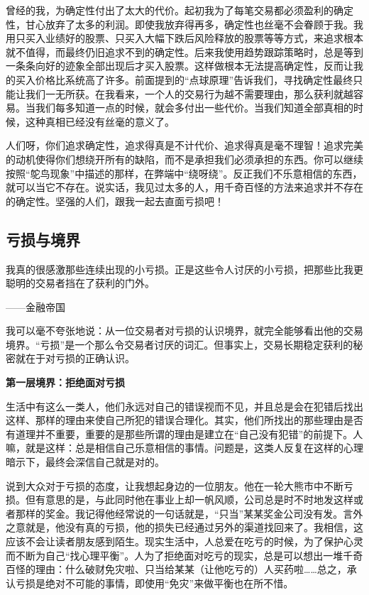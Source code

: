 曾经的我，为确定性付出了太大的代价。起初我为了每笔交易都必须盈利的确定性，甘心放弃了太多的利润。即使我放弃得再多，确定性也丝毫不会眷顾于我。我用只买入业绩好的股票、只买入大幅下跌后风险释放的股票等等方式，来追求根本就不值得，而最终仍旧追求不到的确定性。后来我使用趋势跟踪策略时，总是等到一条条向好的迹象全部出现后才买入股票。这样做根本无法提高确定性，反而让我的买入价格比系统高了许多。前面提到的“点球原理”告诉我们，寻找确定性最终只能让我们一无所获。在我看来，一个人的交易行为越不需要理由，那么获利就越容易。当我们每多知道一点的时候，就会多付出一些代价。当我们知道全部真相的时候，这种真相已经没有丝毫的意义了。

人们呀，你们追求确定性，追求得真是不计代价、追求得真是毫不理智！追求完美的动机使得你们想绕开所有的缺陷，而不是承担我们必须承担的东西。你可以继续按照“鸵鸟现象”中描述的那样，在弊端中“绕呀绕”。反正我们不乐意相信的东西，就可以当它不存在。说实话，我见过太多的人，用千奇百怪的方法来追求并不存在的确定性。坚强的人们，跟我一起去直面亏损吧！

\subsection{亏损与境界}

{\kaishu
我真的很感激那些连续出现的小亏损。正是这些令人讨厌的小亏损，把那些比我更聪明的交易者挡在了获利的门外。

\hfill ——金融帝国
}

我可以毫不夸张地说：从一位交易者对亏损的认识境界，就完全能够看出他的交易境界。“亏损”是一个那么令交易者讨厌的词汇。但事实上，交易长期稳定获利的秘密就在于对亏损的正确认识。

\textbf{第一层境界：拒绝面对亏损}

生活中有这么一类人，他们永远对自己的错误视而不见，并且总是会在犯错后找出这样、那样的理由来使自己所犯的错误合理化。其实，他们所找出的那些理由是否有道理并不重要，重要的是那些所谓的理由是建立在“自己没有犯错”的前提下。人嘛，就是这样：总是相信自己乐意相信的事情。问题是，这类人反复在这样的心理暗示下，最终会深信自己就是对的。

说到大众对于亏损的态度，让我想起身边的一位朋友。他在一轮大熊市中不断亏损。但有意思的是，与此同时他在事业上却一帆风顺，公司总是时不时地发这样或者那样的奖金。我记得他经常说的一句话就是，“只当”某某奖金公司没有发。言外之意就是，他没有真的亏损，他的损失已经通过另外的渠道找回来了。我相信，这应该不会让读者朋友感到陌生。现实生活中，人总爱在吃亏的时候，为了保护心灵而不断为自己“找心理平衡”。人为了拒绝面对吃亏的现实，总是可以想出一堆千奇百怪的理由：什么破财免灾啦、只当给某某（让他吃亏的）人买药啦……总之，承认亏损是绝对不可能的事情，即使用“免灾”来做平衡也在所不惜。

